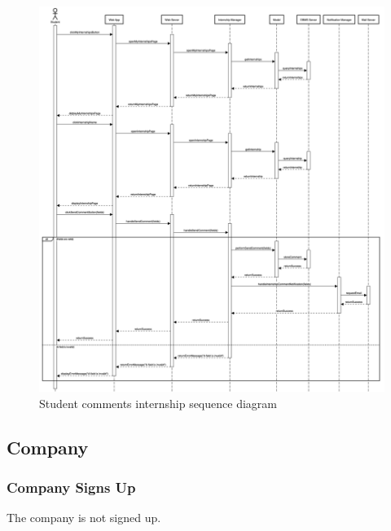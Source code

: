 \begin{figure}[h!]
    \centering
    \includegraphics[width=16cm]{images/sequence-diagrams/student-comments-internship.png}
    \caption{Student comments internship sequence diagram}
\end{figure}

\newpage
\subsection{Company}
\subsubsection{Company Signs Up}
The company is not signed up. 


